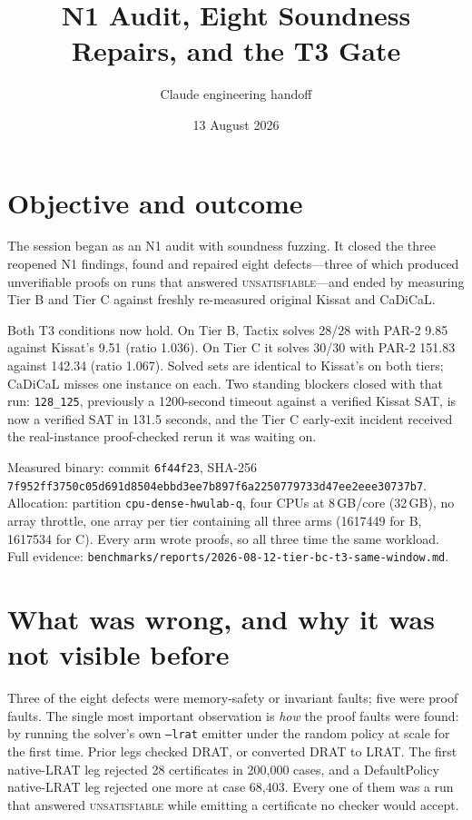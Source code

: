 \documentclass[11pt]{article}
\title{N1 Audit, Eight Soundness Repairs, and the T3 Gate}
\author{Claude engineering handoff}
\date{13 August 2026}
\newcommand{\code}[1]{\texttt{#1}}
\begin{document}
\maketitle

\section*{Objective and outcome}
The session began as an N1 audit with soundness fuzzing.  It closed the three
reopened N1 findings, found and repaired eight defects---three of which
produced unverifiable proofs on runs that answered \textsc{unsatisfiable}---and
ended by measuring Tier B and Tier C against freshly re-measured original
Kissat and CaDiCaL.

Both T3 conditions now hold.  On Tier B, Tactix solves 28/28 with PAR-2 9.85
against Kissat's 9.51 (ratio 1.036).  On Tier C it solves 30/30 with PAR-2
151.83 against 142.34 (ratio 1.067).  Solved sets are identical to Kissat's on
both tiers; CaDiCaL misses one instance on each.  Two standing blockers closed
with that run: \code{128\_125}, previously a 1200-second timeout against a
verified Kissat SAT, is now a verified SAT in 131.5 seconds, and the Tier C
early-exit incident received the real-instance proof-checked rerun it was
waiting on.

Measured binary: commit \code{6f44f23}, SHA-256
\code{7f952ff3750c05d691d8504ebbd3ee7b897f6a2250779733d47ee2eee30737b7}.
Allocation: partition \code{cpu-dense-hwulab-q}, four CPUs at 8\,GB/core
(32\,GB), no array throttle, one array per tier containing all three arms
(1617449 for B, 1617534 for C).  Every arm wrote proofs, so all three time the
same workload.  Full evidence:
\code{benchmarks/reports/2026-08-12-tier-bc-t3-same-window.md}.

\section*{What was wrong, and why it was not visible before}
Three of the eight defects were memory-safety or invariant faults; five were
proof faults.  The single most important observation is \emph{how} the proof
faults were found: by running the solver's own \code{--lrat} emitter under the
random policy at scale for the first time.  Prior legs checked DRAT, or
converted DRAT to LRAT.  The first native-LRAT leg rejected 28 certificates in
200,000 cases, and a DefaultPolicy native-LRAT leg rejected one more at case
68,403.  Every one of them was a run that answered \textsc{unsatisfiable} while
emitting a certificate no checker would accept.
\end{document}
